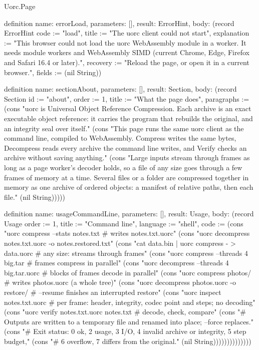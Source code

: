 \begin{lexlean}{Uorc.Page}
\begin{semanticmodule}
definition{
  name: errorLoad,
  parameters: [],
  result: ErrorHint,
  body: (record ErrorHint {code := "load", title := "The uorc client could not start", explanation := "This browser could not load the uorc WebAssembly module in a worker. It needs module workers and WebAssembly SIMD (current Chrome, Edge, Firefox and Safari 16.4 or later).", recovery := "Reload the page, or open it in a current browser.", fields := (nil String)})
}

definition{
  name: sectionAbout,
  parameters: [],
  result: Section,
  body: (record Section {id := "about", order := 1, title := "What the page does", paragraphs := (cons "uorc is Universal Object Reference Compression. Each archive is an exact executable object reference: it carries the program that rebuilds the original, and an integrity seal over itself." (cons "This page runs the same uorc client as the command line, compiled to WebAssembly. Compress writes the same bytes, Decompress reads every archive the command line writes, and Verify checks an archive without saving anything." (cons "Large inputs stream through frames as long as a page worker's decoder holds, so a file of any size goes through a few frames of memory at a time. Several files or a folder are compressed together in memory as one archive of ordered objects: a manifest of relative paths, then each file." (nil String))))})
}

definition{
  name: usageCommandLine,
  parameters: [],
  result: Usage,
  body: (record Usage {order := 1, title := "Command line", language := "shell", code := (cons "uorc compress --stats notes.txt      # writes notes.txt.uorc" (cons "uorc decompress notes.txt.uorc -o notes.restored.txt" (cons "cat data.bin | uorc compress - > data.uorc   # any size: streams through frames" (cons "uorc compress --threads 4 big.tar     # frames compress in parallel" (cons "uorc decompress --threads 4 big.tar.uorc   # blocks of frames decode in parallel" (cons "uorc compress photos/                 # writes photos.uorc (a whole tree)" (cons "uorc decompress photos.uorc -o restore/   # --resume finishes an interrupted restore" (cons "uorc inspect notes.txt.uorc           # per frame: header, integrity, codec point and steps; no decoding" (cons "uorc verify notes.txt.uorc notes.txt  # decode, check, compare" (cons "# Outputs are written to a temporary file and renamed into place; --force replaces." (cons "# Exit status: 0 ok, 2 usage, 3 I/O, 4 invalid archive or integrity, 5 step budget," (cons "# 6 overflow, 7 differs from the original." (nil String)))))))))))))})
}


\end{semanticmodule}
\end{lexlean}
